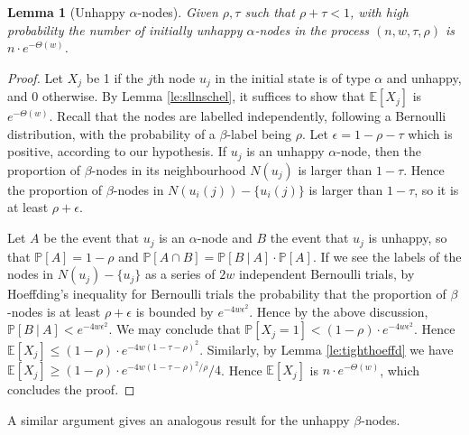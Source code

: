 \documentclass[11pt]{article}
\theoremstyle{plain}
\newtheorem{lem}[thm]{Lemma}
\numberwithin{equation}{subsection}
\DeclareRobustCommand{\expe}[2][{\mbox{$\mathbb{E}$}}]{\ensuremath {#1}\left[ {#2} \right]}
\DeclareRobustCommand{\proba}[2][{\mbox{$\mathbb{P}$}}]{\ensuremath {#1} [ {#2} ]}
\DeclareRobustCommand{\probac}[3][{\mbox{$\mathbb{P}$}}]{\ensuremath {#1}[ {#2} \ |\  {#3} ]}
\begin{document}
\begin{lem}[Unhappy $\alpha$-nodes]
\label{prop:boureduninit}
Given $\rho, \tau$ such that $\rho+\tau<1$,
with high probability 
 the number of initially unhappy $\alpha$-nodes in the process  
$(n,w,\tau,\rho)$ is 
$n\cdot  e^{-\Theta(w)}$.
\end{lem}
\begin{proof}
Let $X_j$ be 1 if the $j$th node $u_j$ 
in the initial state is of type $\alpha$ and unhappy, 
and 0 otherwise.
By Lemma \ref{le:sllnschel}, it suffices to show that
$\expe{X_j}$ is $e^{-\Theta(w)}$.
 Recall that the nodes are labelled independently, following 
 a Bernoulli distribution, with the probability 
 of a $\beta$-label being 
 $\rho$. Let $\epsilon=1-\rho-\tau$ 
 which is positive, according to our hypothesis.
 If $u_j$ is an unhappy $\alpha$-node, 
 then the proportion of $\beta$-nodes in its 
neighbourhood $N(u_j)$ 
is larger than $1-\tau$. 
Hence the proportion of $\beta$-nodes in 
$N(u_i(j))-\{u_i(j)\}$ is larger than $1-\tau$,
so it is at least $\rho+\epsilon$. 

Let $A$ be the event that $u_j$ is an $\alpha$-node 
and $B$ the event that $u_j$ is unhappy, so that
$\proba{A}=1-\rho$ and $\proba{A\cap B}= \probac{B}{A}\cdot \proba{A}$. 
If we see the labels of the nodes in $N(u_j)-\{u_j\}$
as a series of $2w$ independent  Bernoulli trials, 
by Hoeffding's inequality for Bernoulli trials 
the probability that the proportion of $\beta$-nodes 
is at least $\rho+\epsilon$ 
is bounded by $e^{-4w\epsilon^2}$. 
Hence by the above discussion,
$\probac{B}{A}<e^{-4w\epsilon^2}$. 
We may conclude that  
$\proba{X_j=1}< (1-\rho)\cdot e^{-4w\epsilon^2}$. Hence
$\expe{X_j}\leq (1-\rho)\cdot e^{-4w(1-\tau-\rho)^2}$. 
Similarly, by Lemma \ref{le:tighthoeffd} we have
$\expe{X_j} \geq (1-\rho)\cdot e^{-4w(1-\tau-\rho)^2/\rho}/4$.
Hence $\expe{X_j}$ is $n\cdot  e^{-\Theta(w)}$,
which concludes the proof.
\end{proof}

A similar argument gives an analogous result for the unhappy $\beta$-nodes.
\end{document}
